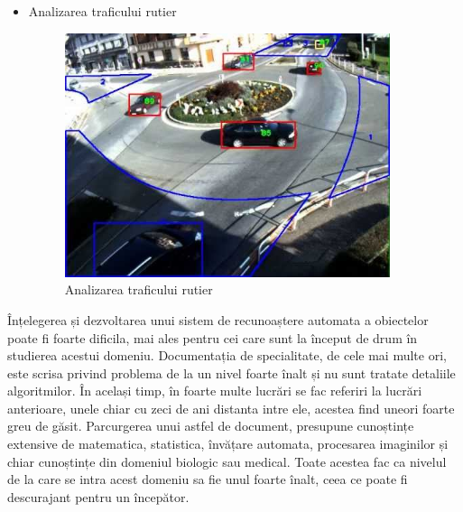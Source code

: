 \begin{itemize}
	\item Analizarea traficului rutier	
	\begin{figure}[H]
		\centering
			\includegraphics[width=0.9\textwidth]{imagini/traffic_analisys.jpg}
		\caption{Analizarea traficului rutier\footnotemark}
		\label{fig:traffic_analisys}
	\end{figure}

\end{itemize}

Înțelegerea și dezvoltarea unui sistem de recunoaștere automata a obiectelor poate fi foarte dificila, mai ales pentru cei care sunt la început de drum în studierea acestui domeniu. 
Documentația de specialitate, de cele mai multe ori, este scrisa privind problema de la un nivel foarte înalt și nu sunt tratate detaliile algoritmilor. 
În același timp, în foarte multe lucrări se fac referiri la lucrări anterioare, unele chiar cu zeci de ani distanta intre ele, acestea find uneori foarte greu de găsit.
Parcurgerea unui astfel de document, presupune cunoștințe extensive de matematica, statistica, învățare automata, procesarea imaginilor și chiar cunoștințe din domeniul biologic sau medical. 
Toate acestea fac ca nivelul de la care se intra acest domeniu sa fie unul foarte înalt, ceea ce poate fi descurajant pentru un începător.

